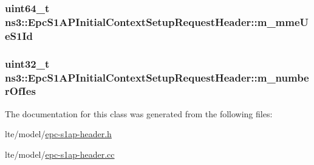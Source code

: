 \subsubsection[{\texorpdfstring{m\+\_\+mme\+Ue\+S1\+Id}{m_mmeUeS1Id}}]{\setlength{\rightskip}{0pt plus 5cm}uint64\+\_\+t ns3\+::\+Epc\+S1\+A\+P\+Initial\+Context\+Setup\+Request\+Header\+::m\+\_\+mme\+Ue\+S1\+Id\hspace{0.3cm}{\ttfamily [private]}}\hypertarget{classns3_1_1EpcS1APInitialContextSetupRequestHeader_a6a9fdc8227eeed2cd24dfda32418c260}{}\label{classns3_1_1EpcS1APInitialContextSetupRequestHeader_a6a9fdc8227eeed2cd24dfda32418c260}
\subsubsection[{\texorpdfstring{m\+\_\+number\+Of\+Ies}{m_numberOfIes}}]{\setlength{\rightskip}{0pt plus 5cm}uint32\+\_\+t ns3\+::\+Epc\+S1\+A\+P\+Initial\+Context\+Setup\+Request\+Header\+::m\+\_\+number\+Of\+Ies\hspace{0.3cm}{\ttfamily [private]}}\hypertarget{classns3_1_1EpcS1APInitialContextSetupRequestHeader_a012f5d047e0878426f6ef74152529fed}{}\label{classns3_1_1EpcS1APInitialContextSetupRequestHeader_a012f5d047e0878426f6ef74152529fed}


The documentation for this class was generated from the following files\+:\begin{DoxyCompactItemize}
\item 
lte/model/\hyperlink{epc-s1ap-header_8h}{epc-\/s1ap-\/header.\+h}\item 
lte/model/\hyperlink{epc-s1ap-header_8cc}{epc-\/s1ap-\/header.\+cc}\end{DoxyCompactItemize}
